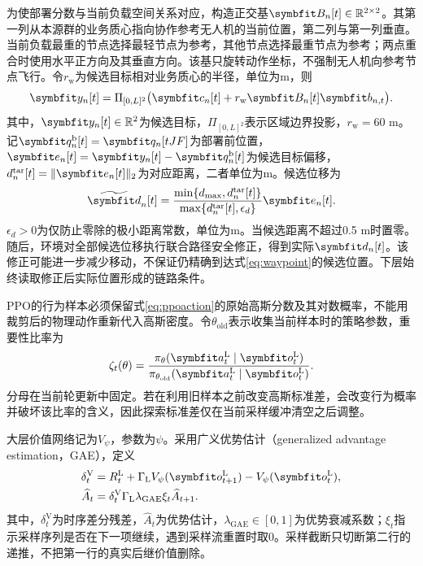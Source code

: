 为使部署分数与当前负载空间关系对应，构造正交基$\mat B_n[t]\in\R^{2\times2}$。其第一列从本源群的业务质心指向协作参考无人机的当前位置，第二列与第一列垂直。当前负载最重的节点选择最轻节点为参考，其他节点选择最重节点为参考；两点重合时使用水平正方向及其垂直方向。该基只旋转动作坐标，不强制无人机向参考节点飞行。令$r_{\mathrm w}$为候选目标相对业务质心的半径，单位为m，则
\begin{equation}
 \vct y_n[t]=\Pi_{[0,L]^2}
 \big(\vct c_n[t]+r_{\mathrm w}\mat B_n[t]\vct b_{n,t}\big).
 \label{eq:waypoint}
\end{equation}
其中，$\vct y_n[t]\in\R^2$为候选目标，$\Pi_{[0,L]^2}$表示区域边界投影，$r_{\mathrm w}=60$ m。记$\vct q_n^{\mathrm b}[t]=\vct q_n[tJF]$为部署前位置，$\vct e_n[t]=\vct y_n[t]-\vct q_n^{\mathrm b}[t]$为候选目标偏移，$d_n^{\mathrm{tar}}[t]=\|\vct e_n[t]\|_2$为对应距离，二者单位为m。候选位移为
\begin{equation}
 \widetilde{\vct d}_n[t]=
 \frac{\min\{d_{\max},d_n^{\mathrm{tar}}[t]\}}
 {\max\{d_n^{\mathrm{tar}}[t],\epsilon_d\}}\vct e_n[t].
 \label{eq:displacement}
\end{equation}
$\epsilon_d>0$为仅防止零除的极小距离常数，单位为m。当候选距离不超过0.5 m时置零。随后，环境对全部候选位移执行联合路径安全修正，得到实际$\vct d_n[t]$。该修正可能进一步减少移动，不保证仍精确到达式\eqref{eq:waypoint}的候选位置。下层始终读取修正后实际位置形成的链路条件。

PPO的行为样本必须保留式\eqref{eq:ppoaction}的原始高斯分数及其对数概率，不能用裁剪后的物理动作重新代入高斯密度。令$\theta_{\mathrm{old}}$表示收集当前样本时的策略参数，重要性比率为
\begin{equation}
 \zeta_t(\theta)=
 \frac{\pi_\theta(\vct a_t^{\mathrm L}\mid\vct o_t^{\mathrm L})}
 {\pi_{\theta_{\mathrm{old}}}(\vct a_t^{\mathrm L}\mid\vct o_t^{\mathrm L})}.
 \label{eq:pporatio}
\end{equation}
分母在当前轮更新中固定。若在利用旧样本之前改变高斯标准差，会改变行为概率并破坏该比率的含义，因此探索标准差仅在当前采样缓冲清空之后调整。

大层价值网络记为$V_\psi$，参数为$\psi$。采用广义优势估计（generalized advantage estimation，GAE），定义
\begin{equation}
 \begin{aligned}
 \delta_t^{\mathrm V}&=R_t^{\mathrm L}
 +\Gamma_{\mathrm L}V_\psi(\vct o_{t+1}^{\mathrm L})
 -V_\psi(\vct o_t^{\mathrm L}),\\
 \widehat A_t&=\delta_t^{\mathrm V}
 \Gamma_{\mathrm L}\lambda_{\mathrm{GAE}}\xi_t\widehat A_{t+1}.
 \end{aligned}
 \label{eq:gae}
\end{equation}
其中，$\delta_t^{\mathrm V}$为时序差分残差，$\widehat A_t$为优势估计，$\lambda_{\mathrm{GAE}}\in[0,1]$为优势衰减系数；$\xi_t$指示采样序列是否在下一项继续，遇到采样流重置时取0。采样截断只切断第二行的递推，不把第一行的真实后继价值删除。

